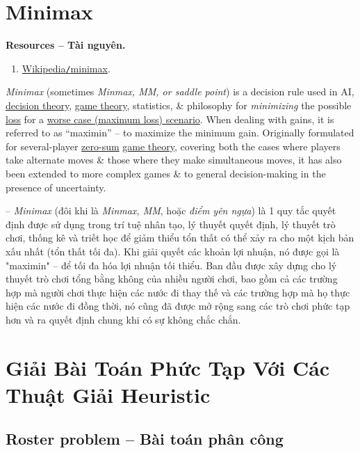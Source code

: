 \documentclass{article}
\begin{document}
\section{Minimax}
\textbf{\textsf{Resources -- Tài nguyên.}}
\begin{enumerate}
	\item \href{https://en.wikipedia.org/wiki/Minimax}{Wikipedia{\tt/}minimax}.
\end{enumerate}
{\it Minimax} (sometimes {\it Minmax, MM, or {\it saddle point}}) is a decision rule used in AI, \href{https://en.wikipedia.org/wiki/Decision_theory}{decision theory}, \href{https://en.wikipedia.org/wiki/Game_theory}{game theory}, statistics, \& philosophy for {\it minimizing} the possible \href{https://en.wikipedia.org/wiki/Loss_function}{loss} for a \href{https://en.wikipedia.org/wiki/Worst-case_scenario}{worse case (maximum loss) scenario}. When dealing with gains, it is referred to as ``maximin'' -- to maximize the minimum gain. Originally formulated for several-player \href{https://en.wikipedia.org/wiki/Zero-sum}{zero-sum} \href{https://en.wikipedia.org/wiki/Game_theory}{game theory}, covering both the cases where players take alternate moves \& those where they make simultaneous moves, it has also been extended to more complex games \& to general decision-making in the presence of uncertainty.

-- {\it Minimax} (đôi khi là {\it Minmax, MM}, hoặc {\it điểm yên ngựa}) là 1 quy tắc quyết định được sử dụng trong trí tuệ nhân tạo, lý thuyết quyết định, lý thuyết trò chơi, thống kê và triết học để giảm thiểu tổn thất có thể xảy ra cho một kịch bản xấu nhất (tổn thất tối đa). Khi giải quyết các khoản lợi nhuận, nó được gọi là "maximin" – để tối đa hóa lợi nhuận tối thiểu. Ban đầu được xây dựng cho lý thuyết trò chơi tổng bằng không của nhiều người chơi, bao gồm cả các trường hợp mà người chơi thực hiện các nước đi thay thế và các trường hợp mà họ thực hiện các nước đi đồng thời, nó cũng đã được mở rộng sang các trò chơi phức tạp hơn và ra quyết định chung khi có sự không chắc chắn.


\section{Giải Bài Toán Phức Tạp Với Các Thuật Giải Heuristic}

\subsection{Roster problem -- Bài toán phân công}
\end{document}
